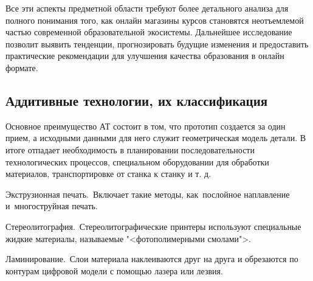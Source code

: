 Все эти аспекты предметной области требуют более детального анализа для полного понимания того, как онлайн магазины курсов становятся неотъемлемой частью современной образовательной экосистемы. Дальнейшее исследование позволит выявить тенденции, прогнозировать будущие изменения и предоставить практические рекомендации для улучшения качества образования в онлайн формате.
\subsection{Аддитивные технологии, их классификация}

Основное преимущество АТ состоит в том, что прототип создается за один прием, а исходными данными для него служит геометрическая модель детали. В итоге отпадает необходимость в планировании последовательности технологических процессов, специальном оборудовании для обработки материалов, транспортировке от станка к станку и т. д.

Экструзионная печать. Включает такие методы, как послойное наплавление и многоструйная печать.

Стереолитография. Стереолитографические принтеры используют специальные жидкие материалы, называемые "<фотополимерными смолами">.

Ламинирование. Слои материала наклеиваются друг на друга и обрезаются по контурам цифровой модели с помощью лазера или лезвия. 
